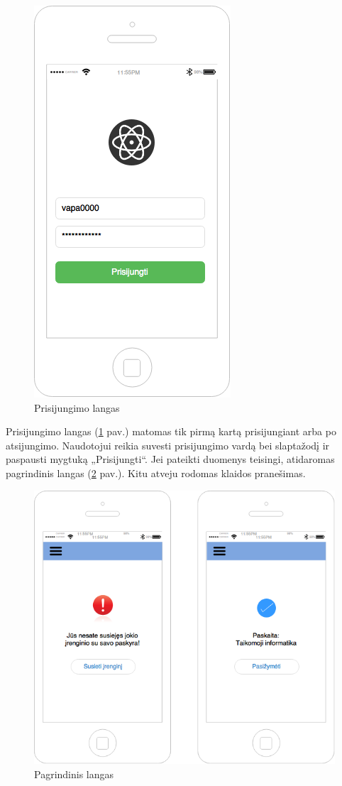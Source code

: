 \documentclass{VUMIFPSkursinis}
\begin{document}
\begin{figure}[H]
	\centering
	\includegraphics[scale=0.5]{img/kursinio_app_login}
	\caption{Prisijungimo langas}
	\label{img:loginView}
\end{figure}

Prisijungimo langas (\ref{img:loginView} pav.) matomas tik pirmą kartą prisijungiant arba po atsijungimo. Naudotojui reikia suvesti prisijungimo vardą bei slaptažodį ir paspausti mygtuką „Prisijungti“. Jei pateikti duomenys teisingi, atidaromas pagrindinis langas (\ref{img:mainView} pav.). Kitu atveju rodomas klaidos pranešimas.

\begin{figure}[H]
	\centering
	\includegraphics[scale=0.5]{img/kursinio_app_main}
	\caption{Pagrindinis langas}
	\label{img:mainView}
\end{figure}
\end{document}
